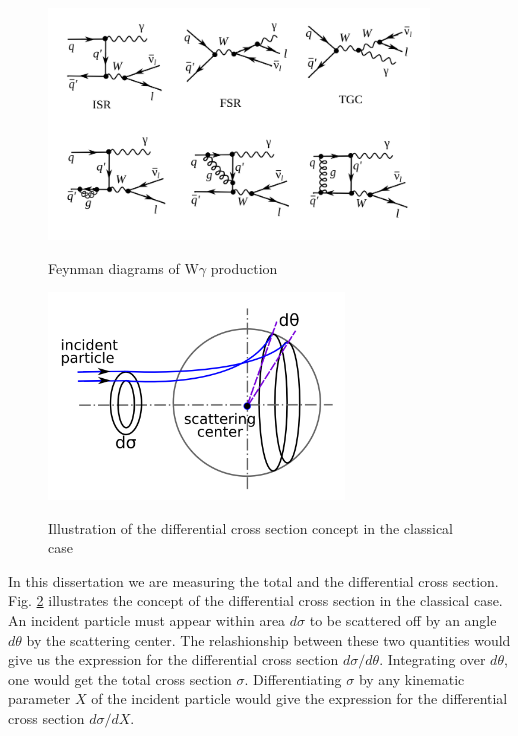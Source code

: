 \begin{figure}[htb]
  \begin{center}
    {\includegraphics[width=0.90\textwidth]{../figs/WgAbout/feynmWg_LO_NLO.png}}
    \caption{Feynman diagrams of W$\gamma$ production}
    \label{fig:feynmWg_LO_NLO}
  \end{center}
\end{figure}


\begin{figure}[htb]
  \begin{center}
    {\includegraphics[width=0.70\textwidth]{../figs/WgAbout/CSclassical.png}}
    \caption{Illustration of the differential cross section concept in the classical case}
    \label{fig:CSclassical}
  \end{center}
\end{figure}

In this dissertation we are measuring the total and the differential cross section. Fig. \ref{fig:CSclassical} illustrates the concept of the differential cross section in the classical case. An incident particle must appear within area $d\sigma$ to be scattered off by an angle $d\theta$ by the scattering center. The relashionship between these two quantities would give us the expression for the differential cross section $d\sigma/d\theta$. Integrating over $d\theta$, one would get the total cross section $\sigma$. Differentiating $\sigma$ by any kinematic parameter $X$ of the incident particle would give the expression for the differential cross section $d\sigma/dX$.\\

